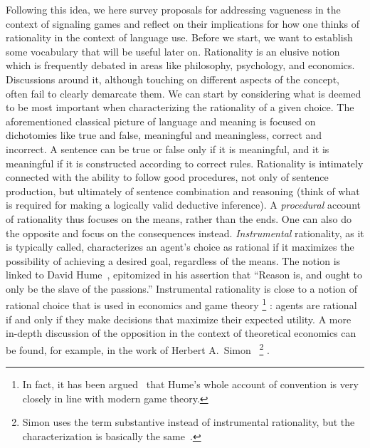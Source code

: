 \documentclass[a4paper]{article}
\begin{document}
Following this idea, we here survey proposals for addressing vagueness in the context of signaling games and reflect on their implications for how one thinks of rationality in the context of language use.
Before we start, we want to establish some vocabulary that will be useful later on.
%
%
%
Rationality is an elusive notion which is frequently debated in areas like philosophy, psychology, and economics.
Discussions around it, although touching on different aspects of the concept, often fail to clearly demarcate them.
We can start by considering what is deemed to be most important when characterizing the rationality of a given choice.
The aforementioned classical picture of language and meaning is focused on dichotomies like true and false, meaningful and meaningless, correct and incorrect.
A sentence can be true or false only if it is meaningful, and it is meaningful if it is constructed according to correct rules.
Rationality is intimately connected with the ability to follow good procedures, not only of sentence production, but ultimately of sentence combination and reasoning (think of what is required for making a logically valid deductive inference).
A \emph{procedural} account of rationality thus focuses on the means, rather than the ends.
One can also do the opposite and focus on the consequences instead.
\emph{Instrumental} rationality, as it is typically called, characterizes an agent's choice as rational if it maximizes the possibility of achieving a desired goal, regardless of the means.
The notion is linked to David Hume~\parencite*{hume_treatise_1738}, epitomized in his assertion that ``Reason is, and ought to only be the slave of the passions.''
Instrumental rationality is close to a notion of rational choice that is used in economics and game theory%
\footnote{In fact, it has been argued~\parencite{vanderschraaf_informal_1998} that Hume's whole account of convention is very closely in line with modern game theory.}%
: agents are rational if and only if they make decisions that maximize their expected utility.
A more in-depth discussion of the opposition in the context of theoretical economics can be found, for example, in the work of Herbert A.~Simon~\parencite*[\emph{e.g.}][]{simon_rationality_1986}%
\footnote{Simon uses the term substantive instead of instrumental rationality, but the characterization is basically the same~\parencite[210-212]{simon_rationality_1986}.}%
.
\end{document}
